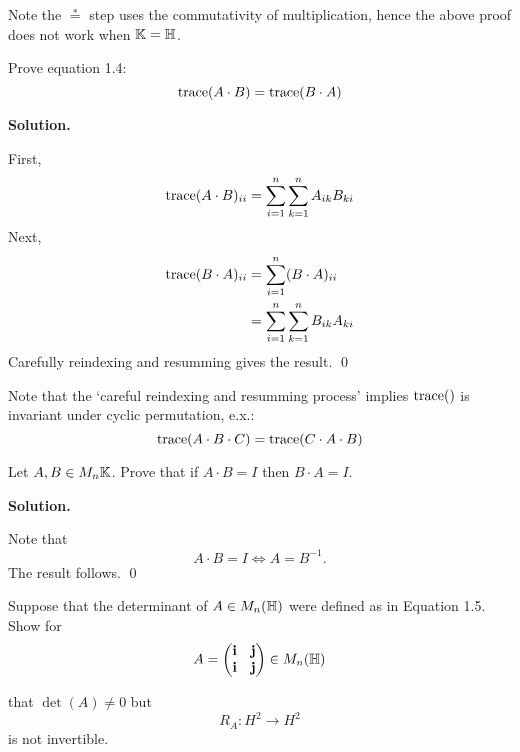 \documentclass[12pt]{book}
\theoremstyle{definition}
\newenvironment{solution}
{%
  \par\noindent\textbf{Solution.}\quad
}
{%
  \qed\par
}
\begin{document}
Note the $\stackrel{*}{=}$ step uses the commutativity of multiplication, 
hence the above proof does not work when $\mathbb{K} = \mathbb{H}$.


\begin{taggedexercise}[\textcolor{green}{Complete}]
  Prove equation 1.4:
\[
\text{trace}({A \cdot B}) = \text{trace}({B \cdot A})
\]
\end{taggedexercise}

\begin{solution}
  First,
  \[
    \begin{aligned}
      \text{trace}({A \cdot B})_{ii} &= \sum_{i=1}^n \sum_{k=1}^n A_{ik}B_{ki} \\
   \end{aligned}
  \]
  Next,
  \[
    \begin{aligned}
      \text{trace}({B \cdot A})_{ii} &= \sum_{i=1}^{n} (B \cdot A)_{ii} \\
                          &= \sum_{i=1}^n \sum_{k=1}^n B_{ik}A_{ki} \\
   \end{aligned}
  \]
  Carefully reindexing and resumming gives the result.
\end{solution}
Note that the `careful reindexing and resumming process' implies $\text{trace}({})$ is invariant under cyclic permutation, e.x.:
\[
  \text{trace}({A \cdot B \cdot C}) = \text{trace}({C \cdot A \cdot B})
\]

\begin{taggedexercise}[\textcolor{green}{Complete}]
  Let $A, B \in M_n{\mathbb{K}}$. Prove that if $A \cdot B = I$ then $B \cdot A = I$.
\end{taggedexercise}

\begin{solution}
  Note that
  \[
  A \cdot B = I \iff A = B^{-1}.
  \]
  The result follows.
\end{solution}

\begin{taggedexercise}[\textcolor{green}{Complete}]
  Suppose that the determinant of $A \in M_n(\mathbb{H})$ were defined as in Equation 1.5. Show for 
\[
  A = \begin{pmatrix} \mathbf{i} & \mathbf{j} \\ \mathbf{i} & \mathbf{j} \end{pmatrix} \in M_n(\mathbb{H})
\]

that $\det(A) \neq 0$ but 
\[
R_A: H^2 \to H^2
\]
is not invertible.
\end{taggedexercise}
\end{document}

